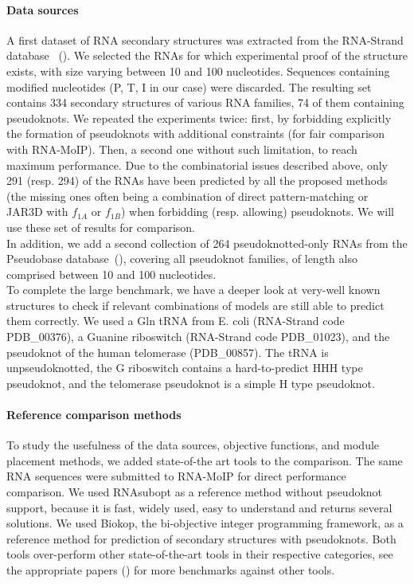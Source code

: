 \documentclass{bioinfo}
\begin{document}
\paragraph{Data sources} \label{sec:data}
A first dataset of RNA secondary structures was extracted from the RNA-Strand database ~(\citealp{andronescu2008rna}). We selected the RNAs for which experimental proof of the structure exists, with size varying between 10 and 100 nucleotides. Sequences containing modified nucleotides (P, T, I in our case) were discarded. The resulting set contains 334 secondary structures of various RNA families, 74 of them containing pseudoknots. We repeated the experiments twice: first, by forbidding explicitly the formation of pseudoknots with additional constraints (for fair comparison with RNA-MoIP). Then, a second one without such limitation, to reach maximum performance. Due to the combinatorial issues described above, only 291 (resp. 294) of the RNAs have been predicted by all the proposed methods (the missing ones often being a combination of direct pattern-matching or JAR3D with $f_{1A}$ or $f_{1B}$) when forbidding (resp. allowing) pseudoknots. We will use these set of results for comparison. \\
In addition, we add a second collection of 264 pseudoknotted-only RNAs from the Pseudobase database~(\citealp{van2000pseudobase}), covering all pseudoknot families, of length also comprised between 10 and 100 nucleotides.\\
To complete the large benchmark, we have a deeper look at very-well known structures to check if relevant combinations of models are still able to predict them correctly.
We used a Gln tRNA from E. coli (RNA-Strand code PDB\_00376), a Guanine riboswitch (RNA-Strand code PDB\_01023), and the pseudoknot of the human telomerase (PDB\_00857). The tRNA is unpseudoknotted, the G riboswitch contains a hard-to-predict HHH type pseudoknot, and the telomerase pseudoknot is a simple H type pseudoknot.

\paragraph{Reference comparison methods}
To study the usefulness of the data sources, objective functions, and module placement methods, we added state-of-the art tools to the comparison. The same RNA sequences were submitted to RNA-MoIP for direct performance comparison. We used RNAsubopt as a reference method without pseudoknot support, because it is fast, widely used, easy to understand and returns several solutions. We used Biokop, the bi-objective integer programming framework, as a reference method for prediction of secondary structures with pseudoknots. Both tools over-perform other state-of-the-art tools in their respective categories, see the appropriate papers (\citealp{lorenz2011viennarna, legendre_bi-objective_2018}) for more benchmarks against other tools.
\end{document}
